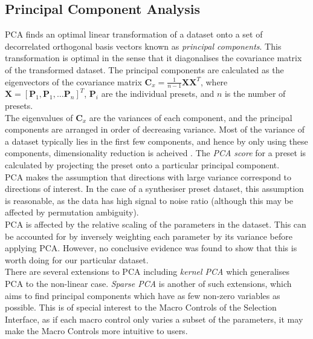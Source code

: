 \documentclass[11pt, oneside]{report}   	%
\renewcommand{\vec}[1]{\mathbf{#1}}
\begin{document}
\subsection{Principal Component Analysis}
PCA finds an optimal linear transformation of a dataset onto a set of decorrelated orthogonal basis vectors known as \emph{principal components}. This transformation is optimal in the sense that it diagonalises the covariance matrix of the transformed dataset. 
The principal components are calculated as the eigenvectors of the covariance matrix $\vec{C}_x = \frac{1}{n-1}\vec{X}\vec{X}^T$, where $\vec{X} = [\vec{P}_1, \vec{P}_1, \dots \vec{P}_n]^T$, $\vec{P}_i$ are the individual presets, and $n$ is the number of presets.\\
The eigenvalues of $\vec{C}_x$ are the variances of each component, and the principal components are arranged in order of decreasing variance.
Most of the variance of a dataset typically lies in the first few components, and hence by only using these components, dimensionality reduction is acheived \cite{PCA}. The \emph{PCA score} for a preset is calculated by projecting the preset onto a particular principal component.\\
PCA makes the assumption that directions with large variance correspond to directions of interest. In the case of a synthesiser preset dataset, this assumption is reasonable, as the data has high signal to noise ratio (although this may be affected by permutation ambiguity).\\
PCA is affected by the relative scaling of the parameters in the dataset. This can be accounted for by inversely weighting each parameter by its variance before applying PCA. However, no conclusive evidence was found to show that this is worth doing for our particular dataset.\\
There are several extensions to PCA including \emph{kernel PCA} which generalises PCA to the non-linear case. \emph{Sparse PCA} is another of such extensions, which aims to find principal components which have as few non-zero variables as possible. This is of special interest to the Macro Controls of the Selection Interface, as if each macro control only varies a subset of the parameters, it may make the Macro Controls more intuitive to users.
\end{document}

